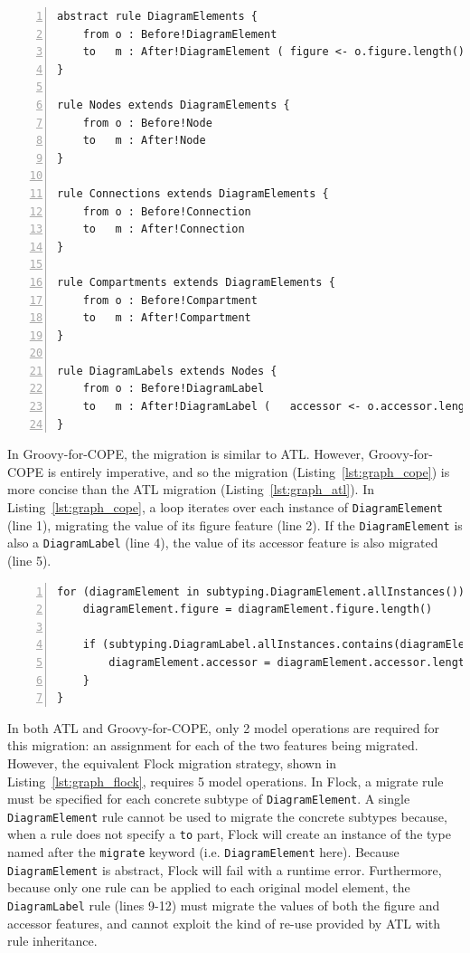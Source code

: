 \begin{lstlisting}[basicstyle=\ttfamily\footnotesize, flexiblecolumns=true, numbers=left, nolol=true, caption=Simplified GMF Graph model migration in ATL, label=lst:graph_atl, language=ATL, tabsize=2]
abstract rule DiagramElements {
	from o : Before!DiagramElement
	to   m : After!DiagramElement ( figure <- o.figure.length()	)
}

rule Nodes extends DiagramElements {
	from o : Before!Node
	to   m : After!Node
}

rule Connections extends DiagramElements {
	from o : Before!Connection
	to   m : After!Connection
}

rule Compartments extends DiagramElements {
	from o : Before!Compartment
	to   m : After!Compartment
}

rule DiagramLabels extends Nodes {
	from o : Before!DiagramLabel
	to   m : After!DiagramLabel (	accessor <- o.accessor.length()	)
}
\end{lstlisting}

In Groovy-for-COPE, the migration is similar to ATL. However, Groovy-for-COPE is entirely imperative, and so the migration (Listing~\ref{lst:graph_cope}) is more concise than the ATL migration (Listing~\ref{lst:graph_atl}). In Listing~\ref{lst:graph_cope}, a loop iterates over each instance of \texttt{DiagramElement} (line 1), migrating the value of its figure feature (line 2). If the \texttt{DiagramElement} is also a \texttt{DiagramLabel} (line 4), the value of its accessor feature is also migrated (line 5).

\begin{lstlisting}[basicstyle=\ttfamily\footnotesize, flexiblecolumns=true, numbers=left, nolol=true, caption=Simplified GMF Graph model migration in COPE, label=lst:graph_cope, language=COPE, tabsize=2]
for (diagramElement in subtyping.DiagramElement.allInstances()) {
	diagramElement.figure = diagramElement.figure.length()
	
	if (subtyping.DiagramLabel.allInstances.contains(diagramElement)) {
		diagramElement.accessor = diagramElement.accessor.length()
	}
}
\end{lstlisting}

In both ATL and Groovy-for-COPE, only 2 model operations are required for this migration: an assignment for each of the two features being migrated. However, the equivalent Flock migration strategy, shown in Listing~\ref{lst:graph_flock}, requires 5 model operations. In Flock, a migrate rule must be specified for each concrete subtype of \texttt{DiagramElement}. A single \texttt{DiagramElement} rule cannot be used to migrate the concrete subtypes because, when a rule does not specify a \texttt{to} part, Flock will create an instance of the type named after the \texttt{migrate} keyword (i.e. \texttt{DiagramElement} here). Because \texttt{DiagramElement} is abstract, Flock will fail with a runtime error. Furthermore, because only one rule can be applied to each original model element, the \texttt{DiagramLabel} rule (lines 9-12) must migrate the values of both the figure and accessor features, and cannot exploit the kind of re-use provided by ATL with rule inheritance.

